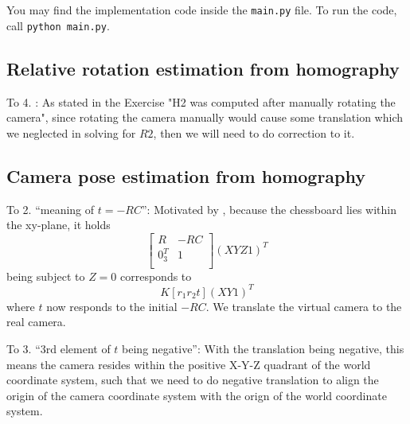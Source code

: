 \documentclass[a4paper, twoside, english]{article}
\begin{document}
You may find the implementation code inside the \lstinline{main.py} file. To run the code, call \lstinline{python main.py}.

\subsection{Relative rotation estimation from homography}

To 4. : As stated in the Exercise "H2 was computed after manually rotating the camera", since rotating the camera manually would cause some translation which we neglected in solving for $R2$, then we will need to do correction to it.  

\subsection{Camera pose estimation from homography}

To 2. ``meaning of $t = -RC$'': Motivated by \cite{EpixeaT-RC}, because the chessboard lies within the xy-plane, it holds 
\begin{equation}
	[K|0_3]
	\begin{bmatrix}
		R	& -RC \\
		0_3^T	& 1 \\
	\end{bmatrix} (X Y Z 1)^T
\end{equation}
being subject to $Z = 0$ corresponds to
\begin{equation}
	K[r_1 r_2 t] (X Y 1)^T
\end{equation}
where $t$ now responds to the initial $-RC$. We translate the virtual camera to the real camera.

To 3. ``3rd element of $t$ being negative'': With the translation being negative, this means the camera resides within the positive X-Y-Z quadrant of the world coordinate system, such that we need to do negative translation to align the origin of the camera coordinate system with the orign of the world coordinate system.



\end{document}
